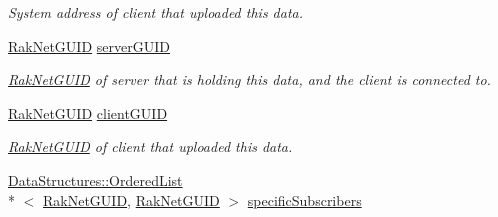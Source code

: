 \begin{DoxyCompactItemize}
\begin{DoxyCompactList}\small\item\em System address of client that uploaded this data. \end{DoxyCompactList}\item 
\hypertarget{struct_rak_net_1_1_cloud_server_1_1_cloud_data_a7ab3076cdeddf12f19d9735b8925d113}{\hyperlink{struct_rak_net_1_1_rak_net_g_u_i_d}{Rak\-Net\-G\-U\-I\-D} \hyperlink{struct_rak_net_1_1_cloud_server_1_1_cloud_data_a7ab3076cdeddf12f19d9735b8925d113}{server\-G\-U\-I\-D}}\label{struct_rak_net_1_1_cloud_server_1_1_cloud_data_a7ab3076cdeddf12f19d9735b8925d113}

\begin{DoxyCompactList}\small\item\em \hyperlink{struct_rak_net_1_1_rak_net_g_u_i_d}{Rak\-Net\-G\-U\-I\-D} of server that is holding this data, and the client is connected to. \end{DoxyCompactList}\item 
\hypertarget{struct_rak_net_1_1_cloud_server_1_1_cloud_data_a26822cbd64a2902f656abffacd1e97bc}{\hyperlink{struct_rak_net_1_1_rak_net_g_u_i_d}{Rak\-Net\-G\-U\-I\-D} \hyperlink{struct_rak_net_1_1_cloud_server_1_1_cloud_data_a26822cbd64a2902f656abffacd1e97bc}{client\-G\-U\-I\-D}}\label{struct_rak_net_1_1_cloud_server_1_1_cloud_data_a26822cbd64a2902f656abffacd1e97bc}

\begin{DoxyCompactList}\small\item\em \hyperlink{struct_rak_net_1_1_rak_net_g_u_i_d}{Rak\-Net\-G\-U\-I\-D} of client that uploaded this data. \end{DoxyCompactList}\item 
\hyperlink{class_data_structures_1_1_ordered_list}{Data\-Structures\-::\-Ordered\-List}\\*
$<$ \hyperlink{struct_rak_net_1_1_rak_net_g_u_i_d}{Rak\-Net\-G\-U\-I\-D}, \hyperlink{struct_rak_net_1_1_rak_net_g_u_i_d}{Rak\-Net\-G\-U\-I\-D} $>$ \hyperlink{struct_rak_net_1_1_cloud_server_1_1_cloud_data_a20639e17af5333fa9a88f2e887a0537b}{specific\-Subscribers}
\end{DoxyCompactItemize}



